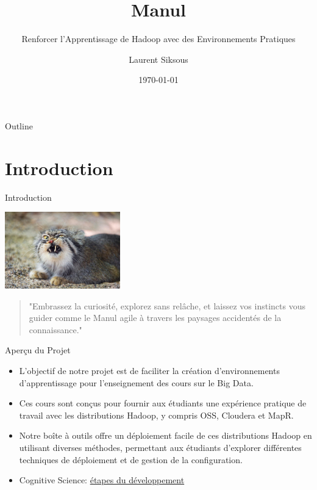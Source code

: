 \documentclass[tiny]{beamer}
\author{Laurent Siksous}
\date{\today}
\title{Manul}
\subtitle{Renforcer l'Apprentissage de Hadoop avec des Environnements Pratiques}
\begin{document}
\maketitle
\begin{frame}{Outline}
\tableofcontents
\end{frame}

\section{Introduction}
\label{sec:orgb06cd09}

\begin{frame}[label={sec:org8967219}]{Introduction}
\begin{center}
\includegraphics[width=5cm]{../../media/manul.jpg}
\end{center}

\begin{quote}
"Embrassez la curiosité, explorez sans relâche, et laissez vos instincts vous
guider comme le Manul agile à travers les paysages accidentés de la
connaissance."
\end{quote}
\end{frame}

\begin{frame}[label={sec:org4617101}]{Aperçu du Projet}
\begin{itemize}
\item L'objectif de notre projet est de faciliter la création d'environnements
d'apprentissage pour l'enseignement des cours sur le Big Data.

\item Ces cours sont conçus pour fournir aux étudiants une expérience pratique de
travail avec les distributions Hadoop, y compris OSS, Cloudera et MapR.

\item Notre boîte à outils offre un déploiement facile de ces distributions
Hadoop en utilisant diverses méthodes, permettant aux étudiants d'explorer
différentes techniques de déploiement et de gestion de la configuration.

\item Cognitive Science:  \href{https://www.youtube.com/watch?v=v4oYOjVDgo0}{étapes du développement}
\end{itemize}
\end{frame}
\end{document}
